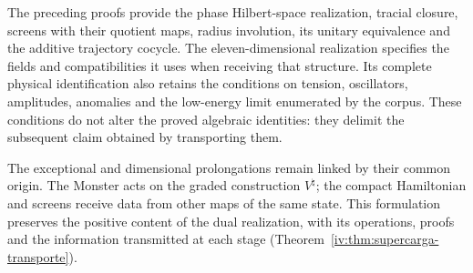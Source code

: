 The preceding proofs provide the phase Hilbert-space
realization, tracial closure, screens
with their quotient maps, radius involution,
its unitary equivalence and the additive trajectory
cocycle. The eleven-dimensional realization
specifies the fields and compatibilities it
uses when receiving that structure. Its complete physical
identification also retains the conditions
on tension, oscillators, amplitudes, anomalies and
the low-energy limit enumerated by the corpus.
These conditions do not alter the proved algebraic
identities: they delimit the subsequent claim
obtained by transporting them.

The exceptional and dimensional prolongations
remain linked by their common origin. The
Monster acts on the graded construction
\(V^\natural\); the compact Hamiltonian and
screens receive data from other maps of the
same state. This formulation preserves the
positive content of the dual realization,
with its operations, proofs and the information
transmitted at each stage (Theorem~\ref{iv:thm:supercarga-transporte}).
